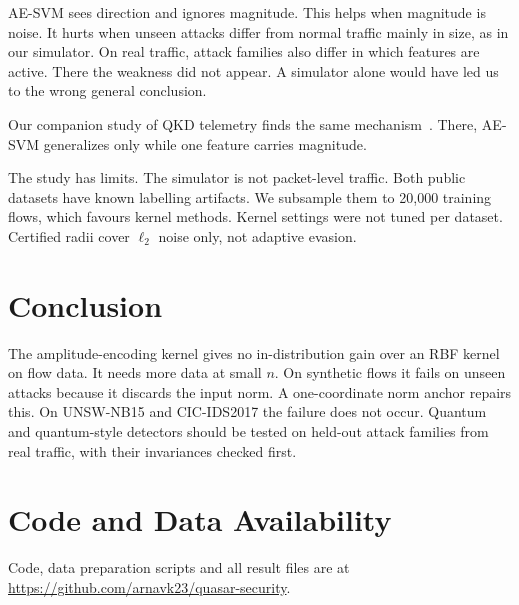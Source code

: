 \documentclass[conference,10pt]{IEEEtran}
\begin{document}
AE-SVM sees direction and ignores magnitude. This helps when magnitude is noise.
It hurts when unseen attacks differ from normal traffic mainly in size, as in our
simulator. On real traffic, attack families also differ in which features are
active. There the weakness did not appear. A simulator alone would have led us to
the wrong general conclusion.

Our companion study of QKD telemetry finds the same mechanism~\cite{kapoor2026hyqad}.
There, AE-SVM generalizes only while one feature carries magnitude.

The study has limits. The simulator is not packet-level traffic. Both public
datasets have known labelling artifacts. We subsample them to 20,000 training
flows, which favours kernel methods. Kernel settings were not tuned per dataset.
Certified radii cover $\ell_2$ noise only, not adaptive evasion.

\section{Conclusion}

The amplitude-encoding kernel gives no in-distribution gain over an RBF kernel on
flow data. It needs more data at small $n$. On synthetic flows it fails on unseen
attacks because it discards the input norm. A one-coordinate norm anchor repairs
this. On UNSW-NB15 and CIC-IDS2017 the failure does not occur. Quantum and
quantum-style detectors should be tested on held-out attack families from real
traffic, with their invariances checked first.

\section*{Code and Data Availability}
Code, data preparation scripts and all result files are at
\url{https://github.com/arnavk23/quasar-security}.



\end{document}
